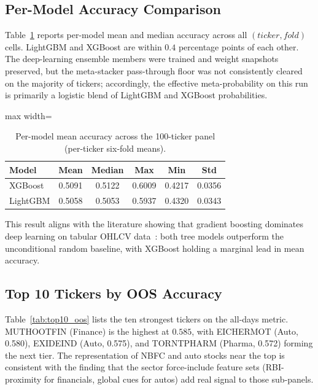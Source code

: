 \subsection{Per-Model Accuracy Comparison}

Table~\ref{tab:model_comparison} reports per-model mean and median accuracy across all \((ticker, fold)\) cells. LightGBM and XGBoost are within \(0.4\) percentage points of each other. The deep-learning ensemble members were trained and weight snapshots preserved, but the meta-stacker pass-through floor was not consistently cleared on the majority of tickers; accordingly, the effective meta-probability on this run is primarily a logistic blend of LightGBM and XGBoost probabilities.

\begin{table}[H]
\centering
\caption{Per-model mean accuracy across the 100-ticker panel (per-ticker six-fold means).}
\label{tab:model_comparison}
\renewcommand{\arraystretch}{1.3}
\begin{adjustbox}{max width=\textwidth}
\begin{tabular}{l c c c c c}
\toprule
\textbf{Model} & \textbf{Mean} & \textbf{Median} & \textbf{Max} & \textbf{Min} & \textbf{Std} \\
\midrule
XGBoost   & 0.5091 & 0.5122 & 0.6009 & 0.4217 & 0.0356 \\
LightGBM  & 0.5058 & 0.5053 & 0.5937 & 0.4320 & 0.0343 \\
\bottomrule
\end{tabular}
\end{adjustbox}
\end{table}

This result aligns with the literature showing that gradient boosting dominates deep learning on tabular OHLCV data~\cite{shwartz2022tabular,grinsztajn2022treesvsdl}: both tree models outperform the unconditional random baseline, with XGBoost holding a marginal lead in mean accuracy.

\subsection{Top 10 Tickers by OOS Accuracy}

Table~\ref{tab:top10_oos} lists the ten strongest tickers on the all-days metric. MUTHOOTFIN (Finance) is the highest at \(0.585\), with EICHERMOT (Auto, 0.580), EXIDEIND (Auto, 0.575), and TORNTPHARM (Pharma, 0.572) forming the next tier. The representation of NBFC and auto stocks near the top is consistent with the finding that the sector force-include feature sets (RBI-proximity for financials, global cues for autos) add real signal to those sub-panels.

